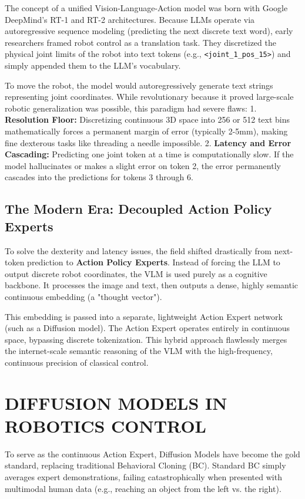 The concept of a unified Vision-Language-Action model was born with Google DeepMind's RT-1 and RT-2 architectures. Because LLMs operate via autoregressive sequence modeling (predicting the next discrete text word), early researchers framed robot control as a translation task. They discretized the physical joint limits of the robot into text tokens (e.g., {\scriptsize\texttt{<joint\_1\_pos\_15>}}) and simply appended them to the LLM's vocabulary. 

To move the robot, the model would autoregressively generate text strings representing joint coordinates. While revolutionary because it proved large-scale robotic generalization was possible, this paradigm had severe flaws:
1. \textbf{Resolution Floor:} Discretizing continuous 3D space into 256 or 512 text bins mathematically forces a permanent margin of error (typically 2-5mm), making fine dexterous tasks like threading a needle impossible.
2. \textbf{Latency and Error Cascading:} Predicting one joint token at a time is computationally slow. If the model hallucinates or makes a slight error on token 2, the error permanently cascades into the predictions for tokens 3 through 6.

\subsection{The Modern Era: Decoupled Action Policy Experts}

To solve the dexterity and latency issues, the field shifted drastically from next-token prediction to \textbf{Action Policy Experts}. Instead of forcing the LLM to output discrete robot coordinates, the VLM is used purely as a cognitive backbone. It processes the image and text, then outputs a dense, highly semantic continuous embedding (a "thought vector"). 

This embedding is passed into a separate, lightweight Action Expert network (such as a Diffusion model). The Action Expert operates entirely in continuous space, bypassing discrete tokenization. This hybrid approach flawlessly merges the internet-scale semantic reasoning of the VLM with the high-frequency, continuous precision of classical control.

\section{DIFFUSION MODELS IN ROBOTICS CONTROL}

To serve as the continuous Action Expert, Diffusion Models have become the gold standard, replacing traditional Behavioral Cloning (BC). Standard BC simply averages expert demonstrations, failing catastrophically when presented with multimodal human data (e.g., reaching an object from the left vs. the right).

